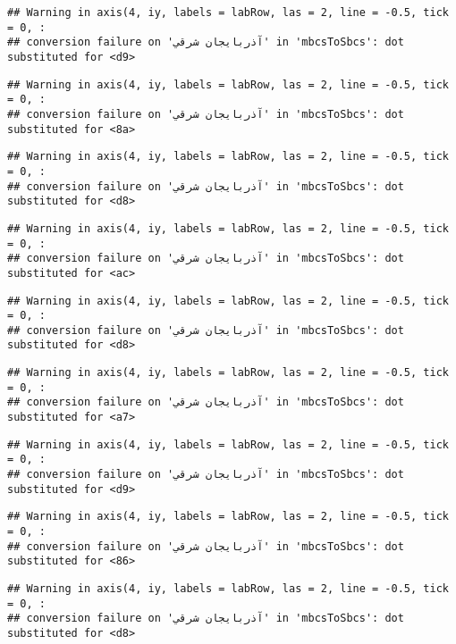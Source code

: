 \documentclass[
]{article}
\begin{document}
\begin{verbatim}
## Warning in axis(4, iy, labels = labRow, las = 2, line = -0.5, tick = 0, :
## conversion failure on 'آذربايجان شرقي' in 'mbcsToSbcs': dot substituted for <d9>
\end{verbatim}

\begin{verbatim}
## Warning in axis(4, iy, labels = labRow, las = 2, line = -0.5, tick = 0, :
## conversion failure on 'آذربايجان شرقي' in 'mbcsToSbcs': dot substituted for <8a>
\end{verbatim}

\begin{verbatim}
## Warning in axis(4, iy, labels = labRow, las = 2, line = -0.5, tick = 0, :
## conversion failure on 'آذربايجان شرقي' in 'mbcsToSbcs': dot substituted for <d8>
\end{verbatim}

\begin{verbatim}
## Warning in axis(4, iy, labels = labRow, las = 2, line = -0.5, tick = 0, :
## conversion failure on 'آذربايجان شرقي' in 'mbcsToSbcs': dot substituted for <ac>
\end{verbatim}

\begin{verbatim}
## Warning in axis(4, iy, labels = labRow, las = 2, line = -0.5, tick = 0, :
## conversion failure on 'آذربايجان شرقي' in 'mbcsToSbcs': dot substituted for <d8>
\end{verbatim}

\begin{verbatim}
## Warning in axis(4, iy, labels = labRow, las = 2, line = -0.5, tick = 0, :
## conversion failure on 'آذربايجان شرقي' in 'mbcsToSbcs': dot substituted for <a7>
\end{verbatim}

\begin{verbatim}
## Warning in axis(4, iy, labels = labRow, las = 2, line = -0.5, tick = 0, :
## conversion failure on 'آذربايجان شرقي' in 'mbcsToSbcs': dot substituted for <d9>
\end{verbatim}

\begin{verbatim}
## Warning in axis(4, iy, labels = labRow, las = 2, line = -0.5, tick = 0, :
## conversion failure on 'آذربايجان شرقي' in 'mbcsToSbcs': dot substituted for <86>
\end{verbatim}

\begin{verbatim}
## Warning in axis(4, iy, labels = labRow, las = 2, line = -0.5, tick = 0, :
## conversion failure on 'آذربايجان شرقي' in 'mbcsToSbcs': dot substituted for <d8>
\end{verbatim}
\end{document}
